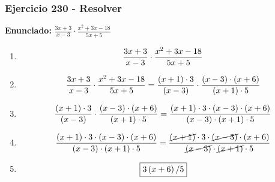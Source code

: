 \documentclass[11pt,a4paper]{article}
\newcommand{\fitmath}[1]{%
\[
\setbox0=\hbox{$\displaystyle #1$}%
\ifdim\wd0>\linewidth
\resizebox{\linewidth}{!}{$\displaystyle #1$}%
\else
#1%
\fi
\]
}
\begin{document}
\subsubsection*{Ejercicio 230 - Resolver}
\textbf{Enunciado:} $ \frac{3 x + 3}{x - 3} \cdot \frac{x^{2} + 3 x - 18}{5 x + 5} $\par
\begin{enumerate}[leftmargin=2em]
\item \fitmath{\frac{3 x + 3}{x - 3} \cdot \frac{x^{2} + 3 x - 18}{5 x + 5}}
\item \fitmath{\frac{3 x + 3}{x - 3} \cdot \frac{x^{2} + 3 x - 18}{5 x + 5}= \frac{\left(x + 1\right)\cdot 3}{\left(x - 3\right)} \cdot \frac{\left(x - 3\right)\cdot \left(x + 6\right)}{\left(x + 1\right)\cdot 5}}
\item \fitmath{\frac{\left(x + 1\right)\cdot 3}{\left(x - 3\right)}\cdot \frac{\left(x - 3\right)\cdot \left(x + 6\right)}{\left(x + 1\right)\cdot 5}= \frac{\left(x + 1\right)\cdot 3\cdot \left(x - 3\right)\cdot \left(x + 6\right)}{\left(x - 3\right)\cdot \left(x + 1\right)\cdot 5}}
\item \fitmath{\frac{\left(x + 1\right)\cdot 3\cdot \left(x - 3\right)\cdot \left(x + 6\right)}{\left(x - 3\right)\cdot \left(x + 1\right)\cdot 5}= \frac{\cancel{\left(x + 1\right)}\cdot 3\cdot \cancel{\left(x - 3\right)}\cdot \left(x + 6\right)}{\cancel{\left(x - 3\right)}\cdot \cancel{\left(x + 1\right)}\cdot 5}}
\item \fitmath{\boxed{3 \left(x + 6\right) / 5}}
\end{enumerate}

\vspace{0.12cm}
\end{document}
